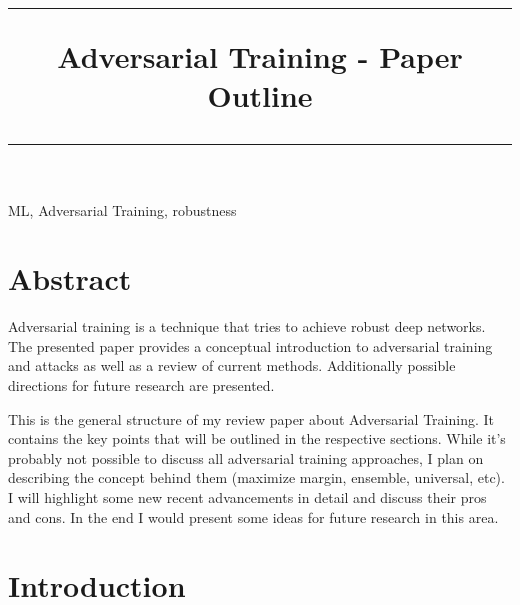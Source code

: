 \documentclass[conference]{IEEEtran}
\begin{document}
\title{\rule{\textwidth}{1pt} Adversarial Training - Paper Outline
\vspace{-1cm} \rule[15pt]{\textwidth}{1pt}}

\author{
\vspace{-1cm}
}

\maketitle

\begin{IEEEkeywords}
  ML, Adversarial Training, robustness
\end{IEEEkeywords}

\section*{Abstract}
Adversarial training is a technique that tries to achieve robust deep networks. The presented paper provides a conceptual introduction to adversarial training and attacks as well as a review of current methods. Additionally possible directions for future research are presented.

This is the general structure of my review paper about Adversarial Training. It contains the key points that will be outlined in the respective sections. While it's probably not possible to discuss all adversarial training approaches, I plan on describing the concept behind them (maximize margin, ensemble, universal, etc). I will highlight some new recent advancements in detail and discuss their pros and cons. In the end I would present some ideas for future research in this area.


\section{Introduction}
\end{document}
